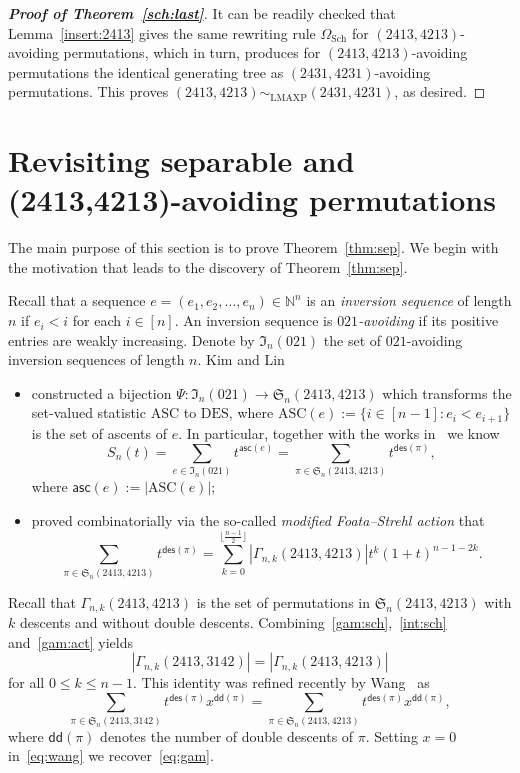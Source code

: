 \documentclass[12pt]{amsart}
\numberwithin{equation}{section}
\theoremstyle{plain}
\theoremstyle{definition}
\newcommand{\N}{\mathbb{N}}
\newcommand{\I}{\mathfrak{I}}
\def\des{\mathsf{des}}
\def\S{\mathfrak{S}}
\def\DES{\mathrm{DES}}
\def\ASC{\mathrm{ASC}}
\def\LMAXP{\mathrm{LMAXP}}
\def\asc{\mathsf{asc}}
\def\dd{\mathsf{dd}}
\begin{document}
\begin{proof}[{\bf Proof of Theorem~\ref{sch:last}}]
It can be readily checked that Lemma~\ref{insert:2413} gives the same rewriting rule $\Omega_{\mathrm{Sch}}$ for $(2413,4213)$-avoiding permutations, which in turn, produces for $(2413,4213)$-avoiding permutations the identical generating tree as $(2431,4231)$-avoiding permutations. This proves $(2413,4213)\sim_{\LMAXP}(2431,4231)$, as desired. 
\end{proof}





\section{Revisiting separable and (2413,4213)-avoiding permutations}
\label{sec:revisit}


The main purpose of this section is to prove Theorem~\ref{thm:sep}. We begin with the motivation that leads to the discovery of Theorem~\ref{thm:sep}.

Recall that a sequence $e=(e_1,e_2,\ldots,e_n)\in\N^n$ is an {\em inversion sequence} of length $n$ if $e_i<i$ for each $i\in[n]$. An inversion sequence is {\em$021$-avoiding} if its positive entries are weakly increasing. Denote by $\I_n(021)$ the set of $021$-avoiding inversion sequences of length $n$.  Kim and Lin~\cite{LK} 
\begin{itemize}
\item constructed a bijection $\Psi:\I_n(021)\rightarrow\S_n(2413,4213)$ which transforms the set-valued statistic $\ASC$ to $\DES$, where $\ASC(e):=\{i\in[n-1]: e_i<e_{i+1}\}$ is the set of ascents of $e$. In particular,  together with the works in~\cite{cor,flz,lin} we know  
\begin{equation}\label{int:sch}
S_n(t)=\sum_{e\in\I_n(021)}t^{\asc(e)}=\sum_{\pi\in\S_n(2413,4213)}t^{\des(\pi)},
\end{equation}
where $\asc(e):=|\ASC(e)|$;
\item proved combinatorially via the so-called {\em modified Foata--Strehl action} that
\begin{equation}\label{gam:act}
\sum_{\pi\in\S_n(2413,4213)}t^{\des(\pi)}=\sum_{k=0}^{\lfloor\frac{n-1}{2}\rfloor}|\Gamma_{n,k}(2413,4213)|t^k(1 + t)^{n-1-2k}.
\end{equation}
\end{itemize}
Recall that $\Gamma_{n,k}(2413,4213)$ is the set of permutations in $\S_n(2413,4213)$ with $k$ descents and without double descents. Combining~\eqref{gam:sch},~\eqref{int:sch} and~\eqref{gam:act} yields 
\begin{equation}\label{eq:gam}
|\Gamma_{n,k}(2413,3142)|=|\Gamma_{n,k}(2413,4213)|
\end{equation} 
for all $0\leq k\leq n-1$. This identity was refined recently by Wang~\cite{wan} as
\begin{equation}\label{eq:wang}
\sum_{\pi\in\S_n(2413,3142)}t^{\des(\pi)}x^{\dd(\pi)}=\sum_{\pi\in\S_n(2413,4213)}t^{\des(\pi)}x^{\dd(\pi)},
\end{equation} 
where $\dd(\pi)$ denotes the number of double descents of $\pi$. Setting $x=0$ in~\eqref{eq:wang} we recover~\eqref{eq:gam}. 
\end{document}

